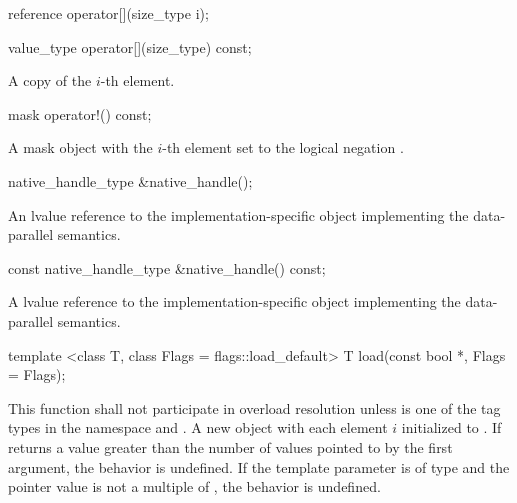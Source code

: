 \begin{itemdecl}
reference operator[](size_type i);
\end{itemdecl}
\begin{itemdescr}
  \dataparElementReference
\end{itemdescr}

\begin{itemdecl}
value_type operator[](size_type) const;
\end{itemdecl}
\begin{itemdescr}
  \pnum\returns A copy of the $i$-th element.
\end{itemdescr}

\begin{itemdecl}
mask operator!() const;
\end{itemdecl}
\begin{itemdescr}
  \pnum\returns A mask object with the $i$-th element set to the logical negation \foralli.
\end{itemdescr}

\begin{itemdecl}
native_handle_type &native_handle();
\end{itemdecl}
\begin{itemdescr}
  \pnum\returns An lvalue reference to the implementation-specific object implementing the data-parallel semantics.
\end{itemdescr}

\begin{itemdecl}
const native_handle_type &native_handle() const;
\end{itemdecl}
\begin{itemdescr}
  \pnum\returns A \const lvalue reference to the implementation-specific object implementing the data-parallel semantics.
\end{itemdescr}


\begin{itemdecl}
template <class T, class Flags = flags::load_default> T load(const bool *, Flags = Flags{});
\end{itemdecl}
\begin{itemdescr}
  \pnum\remarks This function shall not participate in overload resolution unless  is one of the tag types in the  namespace and .
  \pnum\returns A new \mask object with each element $i$ initialized to  \foralli.
  \pnum\remarks If  returns a value greater than the number of values pointed to by the first argument, the behavior is undefined.
  \pnum\remarks If the  template parameter is of type  and the pointer value is not a multiple of , the behavior is undefined.
\end{itemdescr}

